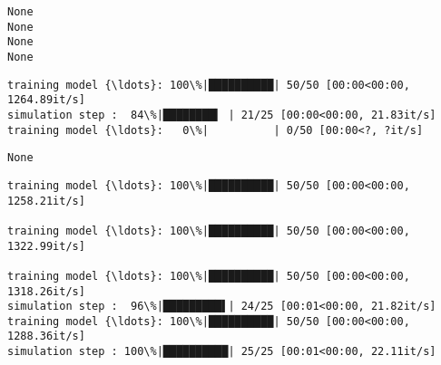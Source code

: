 \documentclass[11pt]{article}
\begin{document}
    \begin{Verbatim}[commandchars=\\\{\}]
None
None
None
None
    \end{Verbatim}

    \begin{Verbatim}[commandchars=\\\{\}]
training model {\ldots}: 100\%|██████████| 50/50 [00:00<00:00, 1264.89it/s]
simulation step :  84\%|████████▍ | 21/25 [00:00<00:00, 21.83it/s]
training model {\ldots}:   0\%|          | 0/50 [00:00<?, ?it/s]
    \end{Verbatim}

    \begin{Verbatim}[commandchars=\\\{\}]
None
    \end{Verbatim}

    \begin{Verbatim}[commandchars=\\\{\}]
training model {\ldots}: 100\%|██████████| 50/50 [00:00<00:00, 1258.21it/s]

training model {\ldots}: 100\%|██████████| 50/50 [00:00<00:00, 1322.99it/s]

training model {\ldots}: 100\%|██████████| 50/50 [00:00<00:00, 1318.26it/s]
simulation step :  96\%|█████████▌| 24/25 [00:01<00:00, 21.82it/s]
training model {\ldots}: 100\%|██████████| 50/50 [00:00<00:00, 1288.36it/s]
simulation step : 100\%|██████████| 25/25 [00:01<00:00, 22.11it/s]
    \end{Verbatim}
\end{document}
